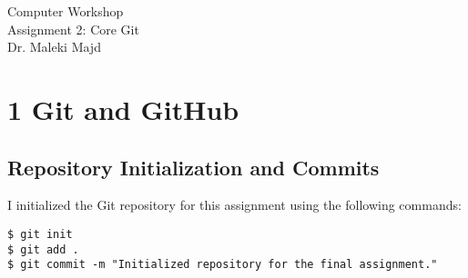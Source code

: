 \documentclass{article}
\begin{document}
\begin{titlepage}
    \centering
    \vspace*{\fill}
    \large{Computer Workshop \\
Assignment 2: Core Git} \\

    \normalsize{Dr. Maleki Majd}
    \vspace*{\fill}
    \thispagestyle{empty}
\end{titlepage}



\tableofcontents
\clearpage

\section{1 Git and GitHub}
\subsection{ Repository Initialization and Commits}
I initialized the Git repository for this assignment using the following commands:
\begin{verbatim}
$ git init
$ git add .
$ git commit -m "Initialized repository for the final assignment."
\end{verbatim}
\end{document}
